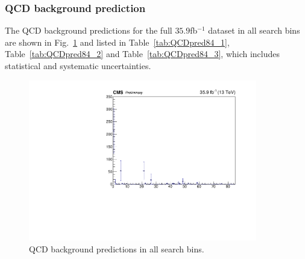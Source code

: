 \subsubsection{QCD background prediction}
The QCD background predictions for the full $35.9$fb$^{-1}$ dataset in all search bins are shown in Fig.~\ref{fig:SBPrediction} and listed in Table~\ref{tab:QCDpred84_1}, Table~\ref{tab:QCDpred84_2} and Table~\ref{tab:QCDpred84_3}, which includes statistical and systematic uncertainties.
\begin{figure}[htbp]
\begin{center}
\includegraphics[width=0.89\textwidth]{sections/mc4/Backgrounds/QCD/figures/84sb/_sb_Data.pdf}
\end{center}\caption{QCD background predictions in all search bins.}
\label{fig:SBPrediction}
\end{figure}

